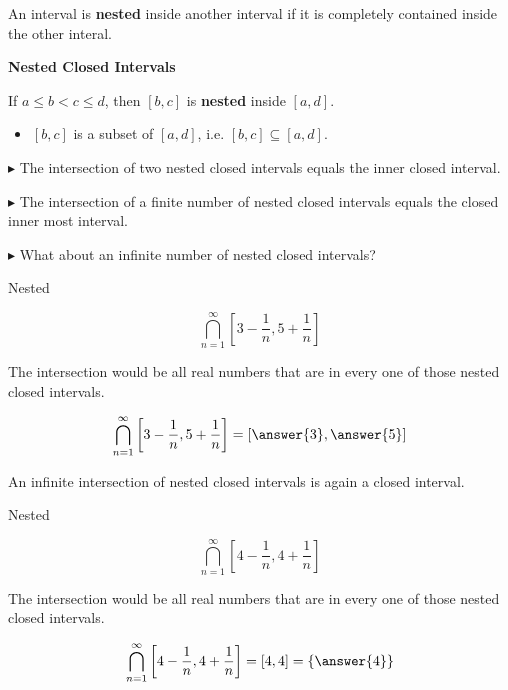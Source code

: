\documentclass{ximera}
\begin{document}
An interval is \textbf{nested} inside another interval if it is completely contained inside the other interal.





\textbf{Nested Closed Intervals}

If $a \leq b < c \leq d$, then $[b,c]$ is \textbf{\textcolor{purple!85!blue}{nested}} inside $[a,d]$.   

\begin{itemize}
\item $[b,c]$ is a subset of $[a,d]$, i.e. $[b,c] \subseteq [a,d]$.
\end{itemize}


$\blacktriangleright$  The intersection of two nested closed intervals equals the inner closed interval.

$\blacktriangleright$  The intersection of a finite number of nested closed intervals equals the closed inner most interval.

$\blacktriangleright$ What about an infinite number of nested closed intervals?



\begin{example} Nested


\[ \bigcap_{n=1}^{\infty}   \left[3 - \frac{1}{n}, 5 + \frac{1}{n}\right]     \]



The intersection would be all real numbers that are in every one of those nested closed intervals.


\[ \bigcap_{n=1}^{\infty}   \left[3 - \frac{1}{n}, 5 + \frac{1}{n}\right]  = \left[\answer{3}, \answer{5}\right]   \]





\end{example} 


An infinite intersection of nested closed intervals is again a closed interval. 






\begin{example} Nested


\[ \bigcap_{n=1}^{\infty}   \left[4 - \frac{1}{n}, 4 +  \frac{1}{n}\right]     \]



The intersection would be all real numbers that are in every one of those nested closed intervals.


\[ \bigcap_{n=1}^{\infty}   \left[4 -  \frac{1}{n}, 4 + \frac{1}{n}\right]    = [4, 4] = \left\{ \answer{4} \right\}  \]





\end{example}
\end{document}
